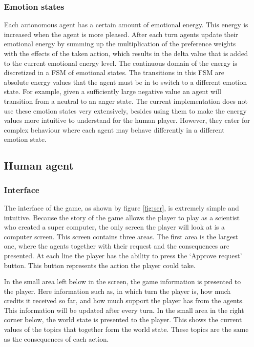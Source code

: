 \documentclass[11pt,a4paper]{article}
\begin{document}
    \subsubsection{Emotion states}
      Each autonomous agent has a certain amount of emotional energy. This energy is increased when the agent is more pleased. After each turn agents update their emotional energy by summing up the multiplication of the preference weights with the effects of the taken action, which results in the delta value that is added to the current emotional energy level. The continuous domain of the energy is discretized in a FSM of emotional states. The transitions in this FSM are absolute energy values that the agent must be in to switch to a different emotion state. For example, given a sufficiently large negative value an agent will transition from a neutral to an anger state. The current implementation does not use these emotion states very extensively, besides using them to make the energy values more intuitive to understand for the human player. However, they cater for complex behaviour where each agent may behave differently in a different emotion state.
  \subsection{Human agent}
    \subsubsection{Interface}
      The interface of the game, as shown by figure \ref{fig:scr}, is extremely simple and intuitive. Because the story of the game allows the player to play as a scientist who created a super computer, the only screen the player will look at is a computer screen. This screen contains three areas. The first area is the largest one, where the agents together with their request and the consequences are presented. At each line the player has the ability to press the `Approve request' button. This button represents the action the player could take. 

      In the small area left below in the screen, the game information is presented to the player. Here information such as, in which turn the player is, how much credits it received so far, and how much support the player has from the agents. This information will be updated after every turn. In the small area in the right corner below, the world state is presented to the player. This shows the current values of the topics that together form the world state. These topics are the same as the consequences of each action. 
\end{document}

